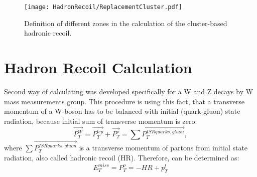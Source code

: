 \begin{figure}[t]
\begin{center}
\texttt{[image: HadronRecoil/ReplacementCluster.pdf]}
\caption{Definition of different zones in the calculation of the cluster-based hadronic recoil. \label{ris:subsCone}}
\end{center}
\end{figure}


\section{Hadron Recoil Calculation}
Second way of calculating \etmiss was developed specifically for a W and Z decays by W mass measurements group. This procedure is using this fact, that a transverse momentum of a W-boson has to be balanced with initial (quark-gluon) state radiation, because initial sum of transverse momentum is zero:
\begin{equation}
\vec{P_{T}^{W}} = \vec{P_T^{lep}}+\vec{P_T^{\nu}}= \sum{\vec{P_{T}^{ISRquarks,gluon}}}, 
\end{equation}
where $\sum{\vec{P_{T}^{ISRquarks,gluon}}}$ is a transverse momentum of partons from initial state radiation, also called hadronic recoil (HR). Therefore, \etmiss can be determined as:
\begin{equation}
E_{T}^{miss} = P_T^{\nu} =  - HR + p_T^{l}
\end{equation} 

